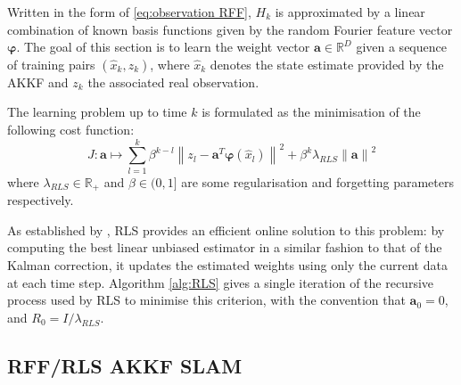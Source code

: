 \documentclass[conference]{IEEEtran}
\begin{document}
Written in the form of \eqref{eq:observation RFF}, $H_k$ is approximated by a linear combination of known basis functions given by the random Fourier feature vector $\boldsymbol{\varphi}$. The goal of this section is to learn the weight vector $\textbf{a}\in\mathbb{R}^D$ given a sequence of training pairs $(\hat{x}_k,z_k)$, where $\hat{x}_k$ denotes the state estimate provided by the AKKF and $z_k$ the associated real observation.

The learning problem up to time $k$ is formulated as the minimisation of the following cost function:
\begin{equation}
J:\textbf{a}\mapsto\sum_{l=1}^k\beta^{k-l}\left\|z_l-\textbf{a}^T\boldsymbol{\varphi}(\hat{x}_l)\right\|^2+
\beta^k\lambda_{RLS}\left\|\textbf{a}\right\|^2
\end{equation}
where $\lambda_{RLS}\in\mathbb{R}_+$ and $\beta\in(0,1]$ are some regularisation and forgetting parameters respectively.

As established by \cite{bib:RFF_RLS}, RLS provides an efficient online solution to this problem: by computing the best linear unbiased estimator in a similar fashion to that of the Kalman correction, it updates the estimated weights using only the current data at each time step. Algorithm \ref{alg:RLS} gives a single iteration of the recursive process used by RLS to minimise this criterion, with the convention that $\textbf{a}_0=0$, and $R_0=I/\lambda_{RLS}$.

\begin{algorithm}[ht]
\begin{algorithmic}
\end{algorithmic}\caption{1 iteration of RLS}\label{alg:RLS}
\end{algorithm}

\subsection{RFF/RLS AKKF SLAM}
\end{document}
